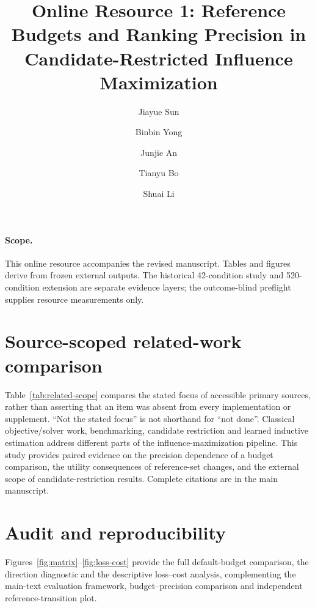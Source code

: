\documentclass[smallextended]{svjour3}
\begin{document}
\title{Online Resource 1: Reference Budgets and Ranking Precision in Candidate-Restricted Influence Maximization}
\author{Jiayue Sun \and Binbin Yong \and Junjie An \and Tianyu Bo \and Shuai Li}
\date{}\maketitle
\paragraph{Scope.} This online resource accompanies the revised manuscript. Tables and figures derive from frozen external outputs. The historical 42-condition study and 520-condition extension are separate evidence layers; the outcome-blind preflight supplies resource measurements only.

\section{Source-scoped related-work comparison}
Table~\ref{tab:related-scope} compares the stated focus of accessible primary
sources, rather than asserting that an item was absent from every implementation
or supplement. ``Not the stated focus'' is not shorthand for ``not done''.
Classical objective/solver work, benchmarking, candidate restriction and learned
inductive estimation address different parts of the influence-maximization
pipeline. This study provides paired evidence on the precision dependence of a
budget comparison, the utility consequences of reference-set changes, and the
external scope of candidate-restriction results. Complete citations are in the
main manuscript.


\section{Audit and reproducibility}
Figures~\ref{fig:matrix}--\ref{fig:loss-cost} provide the full default-budget
comparison, the direction diagnostic and the descriptive loss--cost analysis,
complementing the main-text evaluation framework, budget--precision comparison
and independent reference-transition plot.
\end{document}
